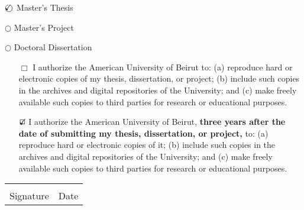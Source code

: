 \begin{titlepage}
\begin{center}
\begin{inparaitem}
 \item[\large{$\text{\rlap{$\checkmark$}}\bigcirc$}]Master's Thesis	\quad \quad \quad
 \item[\large{$\bigcirc$}]Master's Project \quad \quad \quad
 \item[\large{$\bigcirc$}]Doctoral Dissertation 
\end{inparaitem}
\vspace{1cm}
\end{center}


\begin{itemize}
\item[\LARGE{$\Box$}]   \normalsize{ I authorize the American University of Beirut to: (a) reproduce hard or electronic copies of my thesis, dissertation, or project; (b) include such copies in the archives and digital repositories of the University; and (c) make freely available such copies to third parties for research or educational purposes.}
\item[\LARGE{$\text{\rlap{$\checkmark$}}\Box$}]   \normalsize{I authorize the American University of Beirut, {\bf three years after the date of submitting my thesis, dissertation, or project,} to: (a) reproduce hard or electronic copies of it; (b) include such copies in the archives and digital repositories of the University; and (c) make freely available such copies to third parties for research or educational purposes.}\\
\end{itemize}
\vspace{0.8cm}
\begin{flushleft}
\begin{tabular}{p{5cm}p{5cm}}
  \hline
  & \\
  Signature &  Date \\

\end{tabular}
\end{flushleft}
\vspace{0.5cm}


\end{titlepage}

